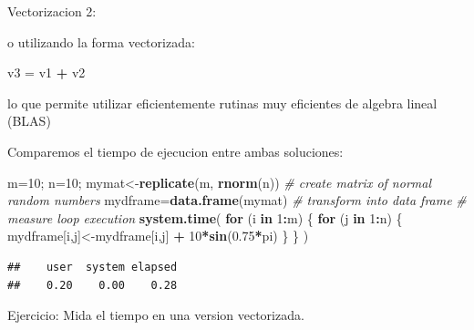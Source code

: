 \documentclass[ignorenonframetext,]{beamer}
\newenvironment{Shaded}{\begin{snugshade}}{\end{snugshade}}
\newcommand{\KeywordTok}[1]{\textcolor[rgb]{0.13,0.29,0.53}{\textbf{#1}}}
\newcommand{\DecValTok}[1]{\textcolor[rgb]{0.00,0.00,0.81}{#1}}
\newcommand{\FloatTok}[1]{\textcolor[rgb]{0.00,0.00,0.81}{#1}}
\newcommand{\StringTok}[1]{\textcolor[rgb]{0.31,0.60,0.02}{#1}}
\newcommand{\CommentTok}[1]{\textcolor[rgb]{0.56,0.35,0.01}{\textit{#1}}}
\newcommand{\ControlFlowTok}[1]{\textcolor[rgb]{0.13,0.29,0.53}{\textbf{#1}}}
\newcommand{\OperatorTok}[1]{\textcolor[rgb]{0.81,0.36,0.00}{\textbf{#1}}}
\newcommand{\NormalTok}[1]{#1}
\begin{document}
\begin{frame}[fragile]

\begin{block}{Vectorizacion 2:}

o utilizando la forma vectorizada:

\begin{Shaded}
\begin{Highlighting}[]
\NormalTok{v3 =}\StringTok{ }\NormalTok{v1 }\OperatorTok{+}\StringTok{ }\NormalTok{v2}
\end{Highlighting}
\end{Shaded}

lo que permite utilizar eficientemente rutinas muy eficientes de algebra
lineal (BLAS)

Comparemos el tiempo de ejecucion entre ambas soluciones:

\begin{Shaded}
\begin{Highlighting}[]
\NormalTok{m=}\DecValTok{10}\NormalTok{; n=}\DecValTok{10}\NormalTok{;}
\NormalTok{mymat<-}\KeywordTok{replicate}\NormalTok{(m, }\KeywordTok{rnorm}\NormalTok{(n)) }\CommentTok{# create matrix of normal random numbers}
\NormalTok{mydframe=}\KeywordTok{data.frame}\NormalTok{(mymat) }\CommentTok{# transform into data frame}
\CommentTok{# measure loop execution}
\KeywordTok{system.time}\NormalTok{(}
\ControlFlowTok{for}\NormalTok{ (i }\ControlFlowTok{in} \DecValTok{1}\OperatorTok{:}\NormalTok{m) \{}
\ControlFlowTok{for}\NormalTok{ (j }\ControlFlowTok{in} \DecValTok{1}\OperatorTok{:}\NormalTok{n) \{}
\NormalTok{mydframe[i,j]<-mydframe[i,j] }\OperatorTok{+}\StringTok{ }\DecValTok{10}\OperatorTok{*}\KeywordTok{sin}\NormalTok{(}\FloatTok{0.75}\OperatorTok{*}\NormalTok{pi)}
\NormalTok{\}}
\NormalTok{\}}
\NormalTok{)}
\end{Highlighting}
\end{Shaded}

\begin{verbatim}
##    user  system elapsed 
##    0.20    0.00    0.28
\end{verbatim}

Ejercicio: Mida el tiempo en una version vectorizada.

\end{block}

\end{frame}
\end{document}
